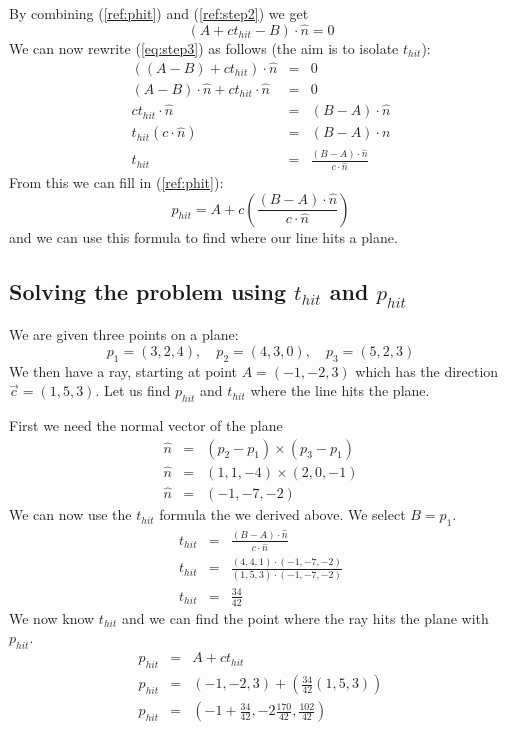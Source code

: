 By combining (\ref{ref:phit}) and (\ref{ref:step2}) we get
\begin{equation}
    \left( A+ct_{hit} -B \right) \cdot \hat{n} = 0
    \label{eq:step3}
\end{equation}
We can now rewrite (\ref{eq:step3}) as follows (the aim is to isolate $t_{hit}$):
\begin{eqnarray*}
    ((A-B) + ct_{hit}) \cdot \hat{n} &=& 0\\
    (A-B) \cdot \hat{n} + ct_{hit} \cdot \hat{n} &=& 0\\
    ct_{hit} \cdot \hat{n} &=& (B-A) \cdot \hat{n}\\
    t_{hit}(c \cdot \hat{n}) &=& (B-A) \cdot{n}\\
    t_{hit} &=& \frac{(B-A) \cdot \hat{n}}{c \cdot \hat{n}} 
\end{eqnarray*}
From this we can fill in (\ref{ref:phit}):
\begin{equation}
    p_{hit} = A +c\left(  \frac{(B-A) \cdot \hat{n}}{c \cdot \hat{n}} \right) 
\end{equation}
and we can use this formula to find where our line hits a plane.

\subsection*{Solving the problem using $t_{hit}$ and $p_{hit}$}
We are given three points on a plane:
\begin{equation*}
    p_1 = (3,2,4), \quad p_2 = (4,3,0), \quad p_3 = (5,2,3)
\end{equation*}
We then have a ray, starting at point $A=(-1,-2,3)$ which has the direction $\vec{c}=(1,5,3)$. Let us find
$p_{hit}$ and $t_{hit}$ where the line hits the plane.

First we need the normal vector of the plane
\begin{eqnarray*}
    \hat{n} &=& (p_2 - p_1) \times (p_3 - p_1)\\
    \hat{n} &=& (1,1,-4) \times (2,0,-1)\\
    \hat{n} &=& (-1,-7,-2)
\end{eqnarray*}
We can now use the $t_{hit}$ formula the we derived above. We select $B=p_1$.
\begin{eqnarray*}
    t_{hit} &=& \frac{(B-A) \cdot \hat{n}}{c \cdot \hat{n}}\\
    t_{hit} &=& \frac{ (4,4,1)\cdot(-1,-7,-2) }{(1,5,3)\cdot(-1,-7,-2)}\\
    t_{hit} &=& \frac{34}{42}
\end{eqnarray*}
We now know $t_{hit}$ and we can find the point where the ray hits the plane
with $p_{hit}$.
\begin{eqnarray*}
    p_{hit} &=& A+ct_{hit}\\
    p_{hit} &=& (-1, -2,3)+\left( \frac{34}{42}(1,5,3) \right)\\
    p_{hit} &=& \left( -1+\frac{34}{42}, -2\frac{170}{42}, \frac{102}{42} \right)
\end{eqnarray*}